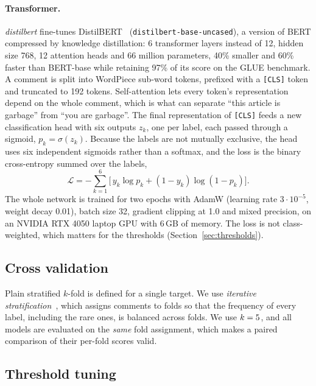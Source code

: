 \documentclass[11pt,a4paper]{article}
\begin{document}
\paragraph{Transformer.}
\emph{distilbert} fine-tunes DistilBERT~\cite{sanh2019}
(\texttt{distilbert-base-uncased}), a version of BERT compressed by knowledge
distillation: 6 transformer layers instead of 12, hidden size 768, 12
attention heads and 66 million parameters, 40\% smaller and 60\% faster than
BERT-base while retaining 97\% of its score on the GLUE benchmark.  A comment
is split into WordPiece sub-word tokens, prefixed with a \texttt{[CLS]} token
and truncated to 192 tokens.  Self-attention lets every token's
representation depend on the whole comment, which is what can separate
``this article is garbage'' from ``you are garbage''.  The final
representation of \texttt{[CLS]} feeds a new classification head with six
outputs $z_k$, one per label, each passed through a sigmoid, $p_k =
\sigma(z_k)$.  Because the labels are not mutually exclusive, the head uses
six independent sigmoids rather than a softmax, and the loss is the binary
cross-entropy summed over the labels,
\begin{equation}
  \mathcal{L} = -\sum_{k=1}^{6} \bigl[\, y_k \log p_k + (1-y_k)\log(1-p_k) \bigr].
\end{equation}
The whole network is trained for two epochs with AdamW (learning rate
$3\cdot10^{-5}$, weight decay 0.01), batch size 32, gradient clipping at 1.0
and mixed precision, on an NVIDIA RTX 4050 laptop GPU with 6\,GB of memory.
The loss is not class-weighted, which matters for the thresholds
(Section~\ref{sec:thresholds}).

\subsection{Cross validation}

Plain stratified $k$-fold is defined for a single target.  We use
\emph{iterative stratification}~\cite{sechidis2011}, which assigns comments to
folds so that the frequency of every label, including the rare ones, is
balanced across folds.  We use $k = 5$, and all models are evaluated on
the \emph{same} fold assignment, which makes a paired comparison of their
per-fold scores valid.

\subsection{Threshold tuning}
\end{document}
